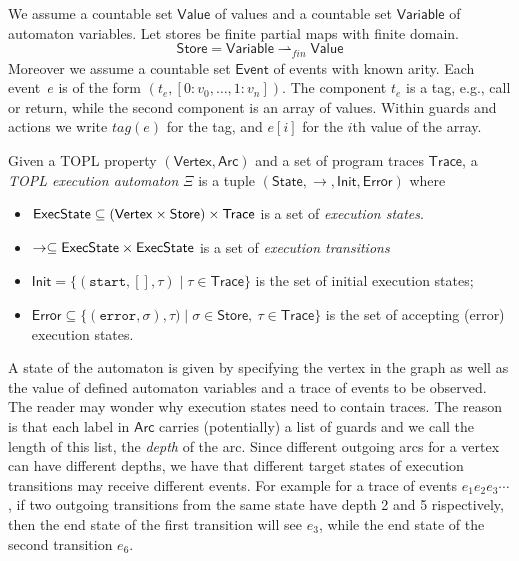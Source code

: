 \documentclass{llncs} %
\newcommand{\pmap}{\rightharpoonup}
\newcommand{\set}[1]{\ensuremath{\mathsf{#1}}}
\begin{document}
We assume a countable set \set{Value} of values and a countable set $\set{Variable}$ of automaton variables. Let stores be finite partial maps with finite domain.
\[
\set{Store} = \set{Variable} \pmap_{\mathit{fin}} \set{Value}
\]
Moreover we assume a countable set \set{Event} of events with known arity. Each event~$e$ is of the form $(t_e,[0: v_0,\dots, 1:v_n])$.
The component $t_e$ is a tag, e.g., call or return, while the second component is an array of values.
Within guards and actions we write $tag(e)$ for the tag, and $e[i]$ for the $i$th value of the array.
%
\begin{definition}
Given a TOPL property $(\set{Vertex},\set{Arc})$ and a set of program traces $\set{Trace}$, a {\em TOPL execution automaton} $\Xi$ is a tuple 
$(\set{State}, \to , \set{Init}, \set{Error})$ where
\begin{itemize}
\item $\set{\World} \subseteq (\set{Vertex}\times \set{Store})\times\set{Trace}$ is a set of {\em execution states}.
\item $\to \subseteq \set{\World} \times \set{\World}$ is a set of {\em execution transitions}
\item $\set{Init}= \{ (\texttt{start}, [], \tau) \mid \tau \in \set{Trace} \}$ is the set of initial execution states;
\item $\set{Error} \subseteq \{ (\texttt{error}, \sigma), \tau) \mid \sigma \in \set{Store},  \ \tau \in \set{Trace} \}$ is the set of accepting (error) execution states.
\end{itemize} 
\end{definition}
A state of the automaton is
given by specifying the vertex in the graph as well as the value of defined automaton variables and a trace of events to be
observed. The reader may wonder why execution states need to contain traces. The reason is that
each label in $\set{Arc}$ carries (potentially) a list of guards and 
we call the length of this list, the \emph{depth} of the arc.
Since different outgoing arcs for a vertex can have different depths, we have that 
different target states of execution transitions may receive different events.
For example for a trace of events $e_1 e_2 e_3\cdots$, if two outgoing transitions from the same state have
depth 2 and 5 rispectively,
then the end state of the first transition will see $e_3$, while the end state of the second transition $e_6$. 
\end{document}
